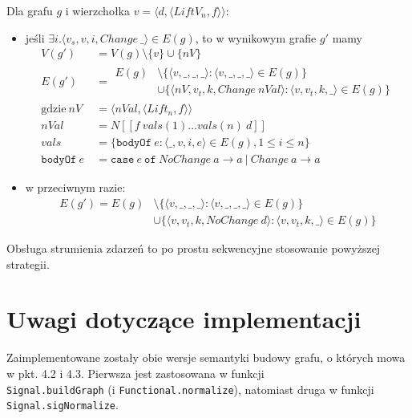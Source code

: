 \documentclass[11pt,leqno]{article}
\begin{document}
Dla grafu $g$ i wierzchołka $v = \langle d, \langle LiftV_n,f \rangle \rangle$:
\begin{itemize}
\item jeśli $ \exists i . \langle v_s , v, i, Change \: \_ \rangle \in E(g) $, to w wynikowym grafie $g'$ mamy
\begin {align*}
V(g') &= V(g) \setminus \{ v \} \cup \{ nV \} \\
E(g') &= \begin{aligned} E(g) &\setminus \{ \langle v, \_, \_, \_ \rangle : \langle v, \_, \_, \_ \rangle \in E(g) \} \\ 
&\cup \{ \langle nV, v_t, k, Change\: nVal \rangle : \langle v, v_t , k, \_ \rangle \in E(g) \} \end{aligned} \\
\text{gdzie} \:
nV &= \langle nVal , \langle Lift_n,f \rangle \rangle \\
nVal &= N [\![f \: vals(1) \ldots vals(n) \: d]\!] \\
vals &= \{ \texttt{bodyOf} \: e : \langle \_ , v, i, e \rangle \in E(g), 1 \leq i \leq n \} \\
\texttt{bodyOf} \: e \: &= \texttt{case} \: e \: \texttt{of} \: NoChange \: a \rightarrow a \: | \: Change \: a \rightarrow a
\end{align*}
\item w przeciwnym razie:
\begin{align*}
E(g') = E(g) &\setminus \{ \langle v, \_, \_, \_ \rangle : \langle v, \_ , \_, \_ \rangle \in E(g) \} \\ 
&\cup \{ \langle v, v_t, k, NoChange\: d \rangle : \langle v, v_t , k, \_ \rangle \in E(g) \}
\end{align*}
\end{itemize}

Obsługa strumienia zdarzeń to po prostu sekwencyjne stosowanie powyższej strategii.

\section{Uwagi dotyczące implementacji}

Zaimplementowane zostały obie wersje semantyki budowy grafu, o których mowa w pkt. 4.2 i 4.3. Pierwsza jest zastosowana w funkcji \\ \texttt{Signal.buildGraph} (i \texttt{Functional.normalize}), natomiast druga w funkcji \texttt{Signal.sigNormalize}.
\end{document}
